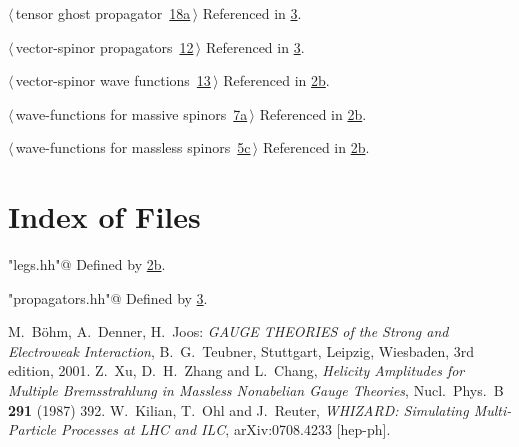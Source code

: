 \documentclass[a4paper,12pt]{amsart}
\renewcommand{\NWlink}[2]{\hyperlink{#1}{#2}}
\renewcommand{\NWtxtDefBy}{Defined by}
\renewcommand{\NWtxtRefIn}{Referenced in}
\begin{document}
{\begin{list}{}{\setlength{\itemsep}{-\parsep}\setlength{\itemindent}{-\leftmargin}}
\item $\langle\,$tensor ghost propagator\nobreak\ {\footnotesize \NWlink{nuweb18a}{18a}}$\,\rangle$ {\footnotesize {\NWtxtRefIn} \NWlink{nuweb3}{3}.}
\item $\langle\,$vector-spinor propagators\nobreak\ {\footnotesize \NWlink{nuweb12}{12}}$\,\rangle$ {\footnotesize {\NWtxtRefIn} \NWlink{nuweb3}{3}.}
\item $\langle\,$vector-spinor wave functions\nobreak\ {\footnotesize \NWlink{nuweb13}{13}}$\,\rangle$ {\footnotesize {\NWtxtRefIn} \NWlink{nuweb2b}{2b}.}
\item $\langle\,$wave-functions for massive spinors\nobreak\ {\footnotesize \NWlink{nuweb7a}{7a}}$\,\rangle$ {\footnotesize {\NWtxtRefIn} \NWlink{nuweb2b}{2b}.}
\item $\langle\,$wave-functions for massless spinors\nobreak\ {\footnotesize \NWlink{nuweb5c}{5c}}$\,\rangle$ {\footnotesize {\NWtxtRefIn} \NWlink{nuweb2b}{2b}.}
\end{list}}

\section{Index of Files}

{\small\begin{list}{}{\setlength{\itemsep}{-\parsep}\setlength{\itemindent}{-\leftmargin}}
\item \verb@"legs.hh"@ {\footnotesize {\NWtxtDefBy} \NWlink{nuweb2b}{2b}.}
\item \verb@"propagators.hh"@ {\footnotesize {\NWtxtDefBy} \NWlink{nuweb3}{3}.}
\end{list}}

\begin{thebibliography}{[8]}
M.~B\"ohm, A.~Denner, H.~Joos: \textit{GAUGE THEORIES
of the Strong and Electroweak Interaction}, B.~G.~Teubner, Stuttgart,
Leipzig, Wiesbaden, 3rd edition, 2001.
  Z.~Xu, D.~H.~Zhang and L.~Chang,
  \textit{Helicity Amplitudes for Multiple Bremsstrahlung
  in Massless Nonabelian Gauge Theories},
  Nucl.\ Phys.\  B {\bf 291} (1987) 392.
  W.~Kilian, T.~Ohl and J.~Reuter,
  \textit{WHIZARD: Simulating Multi-Particle Processes at LHC and ILC},
  arXiv:0708.4233 [hep-ph].
\end{thebibliography}
\end{document}

